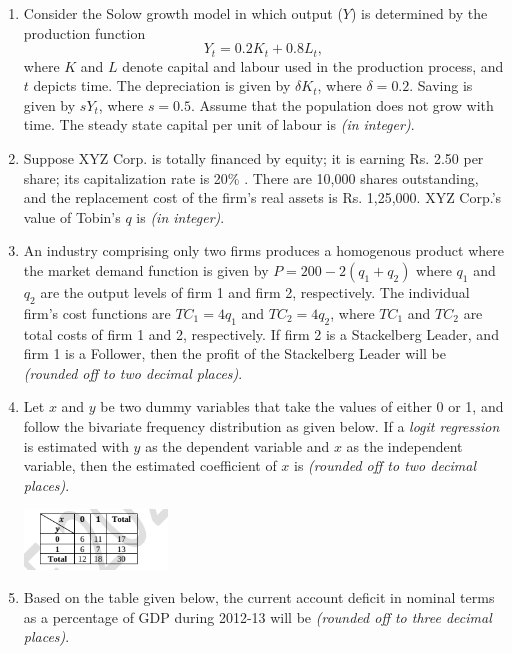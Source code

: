 \documentclass[journal,12pt,onecolumn]{exam}
\theoremstyle{remark}
\begin{document}
\begin{enumerate}
  \item Consider the Solow growth model in which output (\(Y\)) is determined by the production function
  \[
  Y_t = 0.2K_t + 0.8L_t,
  \]
  where \(K\) and \(L\) denote capital and labour used in the production process, and \(t\) depicts time. The depreciation is given by \(\delta K_t\), where \(\delta = 0.2\). Saving is given by \(sY_t\), where \(s=0.5\). Assume that the population does not grow with time. The steady state capital per unit of labour is \underline{\hspace{2cm}} \textit{(in integer)}.

  \item Suppose XYZ Corp. is totally financed by equity; it is earning Rs. 2.50 per share; its capitalization rate is 20\%  . There are 10,000 shares outstanding, and the replacement cost of the firm's real assets is Rs. 1,25,000. XYZ Corp.'s value of Tobin's \(q\) is \underline{\hspace{2cm}} \textit{(in integer)}.


\item An industry comprising only two firms produces a homogenous product where the market demand function is given by \( P = 200 - 2(q_1 + q_2) \) where \( q_1 \) and \( q_2 \) are the output levels of firm 1 and firm 2, respectively. The individual firm's cost functions are \( TC_1 = 4q_1 \) and \( TC_2 = 4q_2 \), where \( TC_1 \) and \( TC_2 \) are total costs of firm 1 and 2, respectively. If firm 2 is a Stackelberg Leader, and firm 1 is a Follower, then the profit of the Stackelberg Leader will be \underline{\hspace{3cm}} \textit{(rounded off to two decimal places)}.

\item Let \( x \) and \( y \) be two dummy variables that take the values of either 0 or 1, and follow the bivariate frequency distribution as given below. If a \textit{logit regression} is estimated with \( y \) as the dependent variable and \( x \) as the independent variable, then the estimated coefficient of \( x \) is \underline{\hspace{3cm}} \textit{(rounded off to two decimal places)}.

\begin{center}
\includegraphics[width=0.3\textwidth]{figs/a3q59.png}
\end{center}
\newpage
\item Based on the table given below, the current account deficit in nominal terms as a percentage of GDP during 2012-13 will be \underline{\hspace{3cm}} \textit{(rounded off to three decimal places)}.


\end{enumerate}
\end{document}
